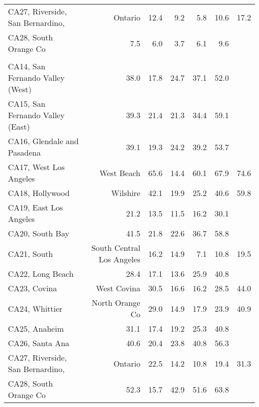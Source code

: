 \begin{longtable}[l]{l|rrrrr}
\hspace{1em}CA27, Riverside, San Bernardino, & Ontario & 12.4 & 9.2 & 5.8 & 10.6 & 17.2\\
\hspace{1em}CA28, South Orange Co & 7.5 & 6.0 & 3.7 & 6.1 & 9.6\\
\addlinespace[0.5em]
\\
\hspace{1em}CA14, San Fernando Valley (West) & 38.0 & 17.8 & 24.7 & 37.1 & 52.0\\
\hspace{1em}CA15, San Fernando Valley (East) & 39.3 & 21.4 & 21.3 & 34.4 & 59.1\\
\hspace{1em}CA16, Glendale and Pasadena & 39.1 & 19.3 & 24.2 & 39.2 & 53.7\\
\hspace{1em}CA17, West Los Angeles & West Beach & 65.6 & 14.4 & 60.1 & 67.9 & 74.6\\
\hspace{1em}CA18, Hollywood & Wilshire & 42.1 & 19.9 & 25.2 & 40.6 & 59.8\\
\hspace{1em}CA19, East Los Angeles & 21.2 & 13.5 & 11.5 & 16.2 & 30.1\\
\hspace{1em}CA20, South Bay & 41.5 & 21.8 & 22.6 & 36.7 & 58.8\\
\hspace{1em}CA21, South & South Central Los Angeles & 16.2 & 14.9 & 7.1 & 10.8 & 19.5\\
\hspace{1em}CA22, Long Beach & 28.4 & 17.1 & 13.6 & 25.9 & 40.8\\
\hspace{1em}CA23, Covina & West Covina & 30.5 & 16.6 & 16.2 & 28.5 & 44.0\\
\hspace{1em}CA24, Whittier & North Orange Co & 29.0 & 14.9 & 17.9 & 23.9 & 40.9\\
\hspace{1em}CA25, Anaheim & 31.1 & 17.4 & 19.2 & 25.3 & 40.8\\
\hspace{1em}CA26, Santa Ana & 40.6 & 20.4 & 23.8 & 40.8 & 56.3\\
\hspace{1em}CA27, Riverside, San Bernardino, & Ontario & 22.5 & 14.2 & 10.8 & 19.4 & 31.3\\
\hspace{1em}CA28, South Orange Co & 52.3 & 15.7 & 42.9 & 51.6 & 63.8\\*
\end{longtable}
\endgroup{}
